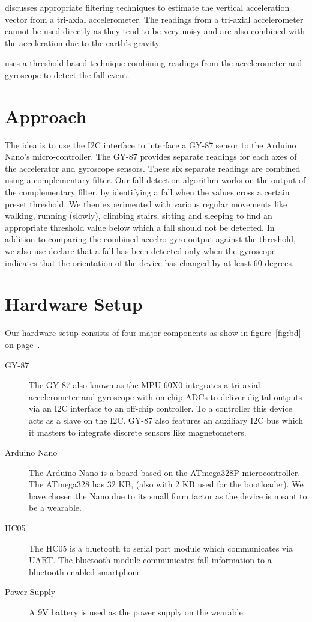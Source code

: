 \documentclass[11pt, a4paper]{article}
\begin{document}
\cite{Bourke2011} discusses appropriate filtering techniques to estimate
the vertical acceleration vector from a tri-axial accelerometer. The
readings from a tri-axial accelerometer cannot be used directly as they
tend to be very noisy and are also combined with the acceleration due to
the earth's gravity.

\cite{Wu2015} uses a threshold based technique combining readings from
the accelerometer and gyroscope to detect the fall-event.

\section{Approach}
The idea is to use the I2C interface to interface a GY-87 sensor to the
Arduino Nano's micro-controller. The GY-87 provides separate readings for each
axes of the accelerator and gyroscope sensors. These six separate readings are
combined using a complementary filter. Our fall detection algorithm works on
the output of the complementary filter, by identifying a fall when the values
cross a certain preset threshold. We then experimented with various regular
movements like walking, running (slowly), climbing stairs, sitting and
sleeping to find an appropriate threshold value below which a fall should not
be detected. In addition to comparing the combined accelro-gyro output against
the threshold, we also use declare that a fall has been detected only when the
gyroscope indicates that the orientation of the device has changed by at least
60 degrees.

\section{Hardware Setup}
Our hardware setup consists of four major components as show in
figure~\ref{fig:bd} on page~\pageref{fig:bd}.

\begin{description}
   \item [GY-87] The GY-87 also known as the MPU-60X0 integrates a
      tri-axial accelerometer and gyroscope with on-chip ADCs to deliver
      digital outputs via an I2C interface to an off-chip controller. To
      a controller this device acts as a slave on the I2C. GY-87 also
      features an auxiliary I2C bus which it masters to integrate
      discrete sensors like magnetometers.

   \item [Arduino Nano] The Arduino Nano is a board based on the
      ATmega328P microcontroller. The ATmega328 has 32 KB, (also with 2
      KB used for the bootloader). We have chosen the Nano due to its
      small form factor as the device is meant to be a wearable.

   \item [HC05] The HC05 is a bluetooth to serial port module which
      communicates via UART. The bluetooth module communicates fall
      information to a bluetooth enabled smartphone

   \item [Power Supply] A 9V battery is used as the power supply on the
      wearable.
\end{description}
\end{document}
